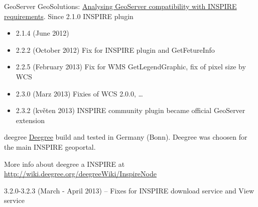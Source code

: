 \documentclass[xcolor=dvipsnames]{beamer}
\begin{document}
\begin{frame}{GeoServer}
    GeoSolutions: \href{http://slideshare.net}{Analysing GeoServer compatibility with INSPIRE requirements}.
Since 2.1.0 INSPIRE plugin
    \begin{itemize}
        \item 2.1.4 (June 2012)
            \pause
        \item 2.2.2 (October 2012) Fix for INSPIRE plugin and GetFetureInfo
            \pause
        \item 2.2.5 (February 2013) Fix for WMS GetLegendGraphic, fix of pixel
            size by WCS
            \pause
        \item 2.3.0 (Marz 2013) Fixies of WCS 2.0.0, \dots
            \pause
        \item 2.3.2 (květen 2013) INSPIRE community plugin became official
            GeoServer extension
    \end{itemize}
\end{frame}


\begin{frame}{deegree}
    \href{http://deegree.org}{Deegree} build and tested in Germany (Bonn).
    Deegree was choosen for the main INSPIRE geoportal.

More info about deegree a INSPIRE at
\url{http://wiki.deegree.org/deegreeWiki/InspireNode}

3.2.0-3.2.3 (March - April 2013) -- Fixes for INSPIRE download service and View service
\end{frame}
\end{document}
